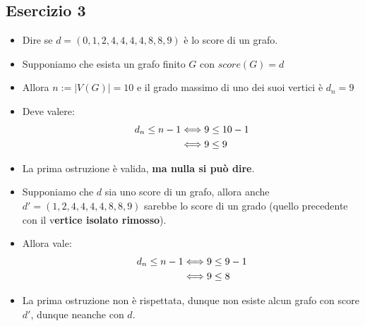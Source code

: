 \documentclass[10pt]{article}
\begin{document}
	\subsection{Esercizio 3}
	\begin{itemize}
	\item
	Dire se $d = (0,1,2,4,4,4,4,8,8,9)$ è lo score di un grafo.
	\item
	Supponiamo che esista un grafo finito $G$ con $score(G) = d$
	\item
	Allora $n := |V(G)| = 10$ e il grado massimo di uno dei suoi vertici è $d_n = 9$
	\item
	Deve valere:
	\begin{equation}
	\begin{split}
		d_n \leq n - 1 &\Longleftrightarrow 9 \leq 10 - 1  \\
		&\Longleftrightarrow 9 \leq 9
		\notag
		\end{split}
	\end{equation}
	\item
	La prima ostruzione è valida, \textbf{ma nulla si può dire}.
	\item
	Supponiamo che $d$ sia uno score di un grafo, allora anche $d' = (1,2,4,4,4,4,8,8,9)$ sarebbe lo score di un grado (quello precedente con il v\textbf{ertice isolato rimosso}).
	\item
	Allora vale:
	\begin{equation}
	\begin{split}
		d_n \leq n - 1 &\Longleftrightarrow 9 \leq 9 - 1  \\
		&\Longleftrightarrow 9 \leq 8
		\notag
		\end{split}
	\end{equation}
	\item
	La prima ostruzione non è rispettata, dunque non esiste alcun grafo con score $d'$, dunque neanche con $d$.
	\end{itemize}
\end{document}
